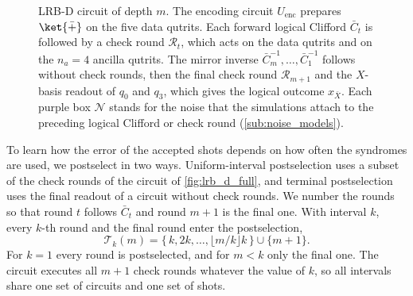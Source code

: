 \begin{figure}[tp]
    \centering
    \caption{LRB-D circuit of depth $m$. The encoding circuit $U_{\mathrm{enc}}$ prepares $\ket{\bar +}$ on the five data qutrits. Each forward logical Clifford $\bar C_t$ is followed by a check round $\mathcal{R}_t$, which acts on the data qutrits and on the $n_a = 4$ ancilla qutrits. The mirror inverse $\bar C_m^{-1}, \dots, \bar C_1^{-1}$ follows without check rounds, then the final check round $\mathcal{R}_{m+1}$ and the $X$-basis readout of $q_0$ and $q_3$, which gives the logical outcome $x_{\bar X}$. Each purple box $\mathcal{N}$ stands for the noise that the simulations attach to the preceding logical Clifford or check round (\autoref{sub:noise_models}).}
    \label{fig:lrb_d_full}\label{fig:lrb_a}
\end{figure}

To learn how the error of the accepted shots depends on how often the syndromes are used, we postselect in two ways. Uniform-interval postselection uses a subset of the check rounds of the circuit of \autoref{fig:lrb_d_full}, and terminal postselection uses the final readout of a circuit without check rounds. We number the rounds so that round $t$ follows $\bar C_t$ and round $m+1$ is the final one. With interval $k$, every $k$-th round and the final round enter the postselection,
\begin{equation}
    \mathcal{T}_k(m) = \{\, k, 2k, \dots, \lfloor m/k \rfloor k \,\} \cup \{ m+1 \} .
    \label{eq:unif_rounds}
\end{equation}
For $k = 1$ every round is postselected, and for $m < k$ only the final one. The circuit executes all $m+1$ check rounds whatever the value of $k$, so all intervals share one set of circuits and one set of shots.


